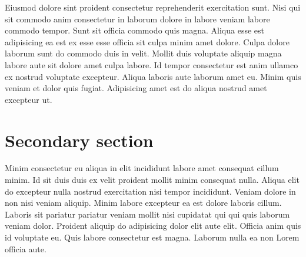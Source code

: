 \documentclass[
12pt,
openright,
oneside,
a4paper,
chapter=TITLE,
section=TITLE,
french,
spanish,
brazil,
english
]{abntex2}
\renewcommand{\baselinestretch}{1.5}
\newcommand{\newbibname}{REFERENCES}
\begin{document}
Eiusmod dolore sint proident consectetur reprehenderit exercitation
sunt. Nisi qui sit commodo anim consectetur in laborum dolore in labore
veniam labore commodo tempor. Sunt sit officia commodo quis magna.
Aliqua esse est adipisicing ea est ex esse esse officia sit culpa minim
amet dolore. Culpa dolore laborum sunt do commodo duis in velit. Mollit
duis voluptate aliquip magna labore aute sit dolore amet culpa labore.
Id tempor consectetur est anim ullamco ex nostrud voluptate excepteur.
Aliqua laboris aute laborum amet eu. Minim quis veniam et dolor quis
fugiat. Adipisicing amet est do aliqua nostrud amet excepteur ut.

\hypertarget{secondary-section-2}{%
\section{Secondary section}\label{secondary-section-2}}

Minim consectetur eu aliqua in elit incididunt labore amet consequat
cillum minim. Id sit duis duis ex velit proident mollit minim consequat
nulla. Aliqua elit do excepteur nulla nostrud exercitation nisi tempor
incididunt. Veniam dolore in non nisi veniam aliquip. Minim labore
excepteur ea est dolore laboris cillum. Laboris sit pariatur pariatur
veniam mollit nisi cupidatat qui qui quis laborum veniam dolor. Proident
aliquip do adipisicing dolor elit aute elit. Officia anim quis id
voluptate eu. Quis labore consectetur est magna. Laborum nulla ea non
Lorem officia aute.


\postextual

\begingroup
\renewcommand{\baselinestretch}{1}
\setcounter{footnote}{0}
\renewcommand{\thefootnote}{\fnsymbol{footnote}}
\printbibliography[heading=bay]
\endgroup

\addcontentsline{toc}{chapter}{
  \protect\numberline{}
  \newbibname
  \hspace{-0.25em}
}
\end{document}
